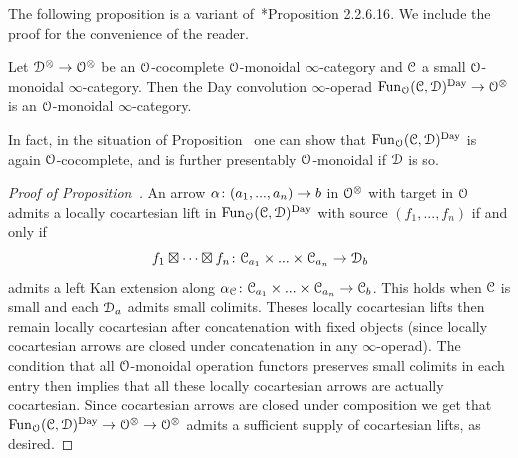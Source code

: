 The following proposition is a variant of~\cite{HA}*{Proposition 2.2.6.16}. We include the proof for the convenience of the reader.

\begin{proposition}
\label{proposition:day-cocartesian}%
Let $\mathcal{D}^{\otimes} \to \mathcal{O}^{\otimes}$ be an $\mathcal{O}$-cocomplete $\mathcal{O}$-monoidal $\infty$-category and $\mathcal C$ a small $\mathcal{O}$-monoidal $\infty$-category. Then the Day convolution $\infty$-operad $\operatorname{Fun}_{\mathcal{O}}(\mathcal C,\mathcal{D})^{\mathrm{Day}} \to \mathcal{O}^{\otimes}$ is an $\mathcal{O}$-monoidal $\infty$-category.
\end{proposition}

In fact, in the situation of Proposition~ one can show that $\operatorname{Fun}_{\mathcal{O}}(\mathcal C,\mathcal{D})^{\mathrm{Day}}$ is again $\mathcal{O}$-cocomplete, and is further presentably $\mathcal{O}$-monoidal if $\mathcal{D}$ is so. %

\begin{proof}[Proof of Proposition~]
An arrow $\alpha\colon (a_1,...,a_n) \to b$ in $\mathcal{O}^{\otimes}$ with target in $\mathcal{O}$ admits a locally cocartesian lift in $\operatorname{Fun}_{\mathcal{O}}(\mathcal C,\mathcal{D})^{\mathrm{Day}}$ with source $(f_1,...,f_n)$ if and only if 
\[
f_1 \boxtimes \dots \boxtimes f_n\colon \mathcal C_{a_1} \times ... \times \mathcal C_{a_n} \to \mathcal{D}_b
\]
admits a left Kan extension along $\alpha_{\mathcal C}\colon \mathcal C_{a_1} \times ... \times \mathcal C_{a_n} \to \mathcal C_b$. This holds when $\mathcal C$ is small and each $\mathcal{D}_a$ admits small colimits. 
Theses locally cocartesian lifts then remain locally cocartesian after concatenation with fixed objects (since locally cocartesian arrows are closed under concatenation in any $\infty$-operad). The condition that all $\mathcal{O}$-monoidal operation functors preserves small colimits in each entry then implies that all these locally cocartesian arrows are actually cocartesian.
Since cocartesian arrows are closed under composition we get that $\operatorname{Fun}_{\mathcal{O}}(\mathcal C,\mathcal{D})^{\mathrm{Day}} \to \mathcal{O}^{\otimes} \to \mathcal{O}^{\otimes}$ admits a sufficient supply of cocartesian lifts, as desired.
\end{proof}


